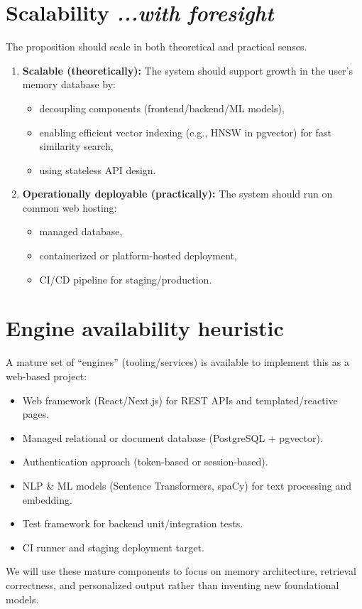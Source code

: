 \documentclass[11pt,a4paper]{article}
\begin{document}
\section[Scalability]{Scalability \hfill \normalsize\normalfont\textit{...with foresight}}
The proposition should scale in both theoretical and practical senses.
\begin{enumerate}
    \item \textbf{Scalable (theoretically):} The system should support growth in the user's memory database by:
    \begin{itemize}
        \item decoupling components (frontend/backend/ML models),
        \item enabling efficient vector indexing (e.g., HNSW in pgvector) for fast similarity search,
        \item using stateless API design.
    \end{itemize}
    \item \textbf{Operationally deployable (practically):} The system should run on common web hosting:
    \begin{itemize}
        \item managed database,
        \item containerized or platform-hosted deployment,
        \item CI/CD pipeline for staging/production.
    \end{itemize}
\end{enumerate}

\section{Engine availability heuristic}
A mature set of ``engines'' (tooling/services) is available to implement this as a web-based project:
\begin{itemize}
    \item Web framework (React/Next.js) for REST APIs and templated/reactive pages.
    \item Managed relational or document database (PostgreSQL + pgvector).
    \item Authentication approach (token-based or session-based).
    \item NLP \& ML models (Sentence Transformers, spaCy) for text processing and embedding.
    \item Test framework for backend unit/integration tests.
    \item CI runner and staging deployment target.
\end{itemize}
We will use these mature components to focus on memory architecture, retrieval correctness, and personalized output rather than inventing new foundational models.
\end{document}
